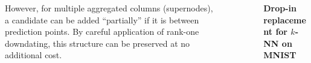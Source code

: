 \documentclass{beamer}                             %
\newcommand{\blocktitle}[1]{{\Large \textbf{#1}}}
\begin{document}
\begin{frame}[t]
\begin{columns}[T]
\begin{column}{0.30\textwidth}
\begin{tcolorbox}
\begin{columns}
\begin{column}{0.5\textwidth}
        \vspace{\baselineskip}
        However, for multiple aggregated columns (supernodes), a candidate can
        be added ``partially'' if it is between prediction points. By careful
        application of rank-one downdating, this structure can be preserved at
        no additional cost.
      \end{column}
      \begin{column}{0.5\textwidth}
        \begin{figure}[h!]
          \centering
        \end{figure}
      \end{column}
    \end{columns}
  \end{tcolorbox}
\end{column}

\begin{column}{0.01\textwidth}
  \begin{center}
    \textcolor{darksilver}{\rule[-1cm]{1mm}{0.8\textheight}}
  \end{center}
\end{column}


\begin{column}{0.30\textwidth}
  \begin{tcolorbox}
    \blocktitle{Drop-in replacement for \( k \)-NN on MNIST}


\end{tcolorbox}
\end{column}
\end{columns}
\end{frame}
\end{document}
